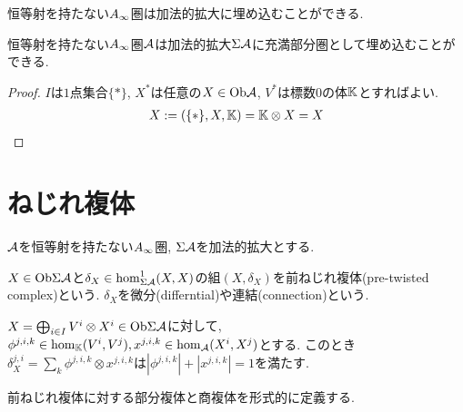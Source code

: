 \documentclass[uplatex, a4paper, 14Q, dvipdfmx]{jsarticle}
\begin{document}
恒等射を持たない$A_{\infty}$圏は加法的拡大に埋め込むことができる. 

\begin{lemma} \label{prop_A_embedding_to_TwA}
  恒等射を持たない$A_{\infty}$圏$\mathcal{A}$は加法的拡大$\Sigma\mathcal{A}$に充満部分圏として埋め込むことができる. 
\end{lemma}

\begin{proof}
  $I$は$1$点集合$\{\ast\}$, $X^\ast$は任意の$X \in \mathrm{Ob}\mathcal{A}$, $V^\ast$は標数$0$の体$\mathbb{K}$とすればよい. 
  \begin{align*}
    X := (\{\ast\}, X, \mathbb{K}) = \mathbb{K} \otimes X = X
  \end{align*}
\end{proof}

\section{ねじれ複体}

$\mathcal{A}$を恒等射を持たない$A_{\infty}$圏, $\Sigma\mathcal{A}$を加法的拡大とする. 

\begin{definition}[前ねじれ複体]
  $X \in \mathrm{Ob}\Sigma\mathcal{A}$と$\delta_X \in \hom^1_{\Sigma\mathcal{A}}(X,X)$の組$(X,\delta_X)$を前ねじれ複体(pre-twisted complex)という. 
  $\delta_X$を微分(differntial)や連結(connection)という. 
\end{definition}

\begin{remark}
  $X = \bigoplus_{i \in I} V^i \otimes X^i \in \mathrm{Ob}\Sigma\mathcal{A}$に対して, $\phi^{j,i,k} \in \hom_{\mathbb{K}}(V^i,V^j), x^{j,i,k} \in \hom_{\mathcal{A}}(X^i,X^j)$とする.
  このとき$\delta_X^{j,i} = \sum_{k} \phi^{j,i,k} \otimes x^{j,i,k}$は$|\phi^{j,i,k}| + |x^{j,i,k}| = 1$を満たす. 
\end{remark}

前ねじれ複体に対する部分複体と商複体を形式的に定義する. 

\begin{definition}[部分複体]
  
\end{definition}

\begin{definition}[商複体]
  
\end{definition}
\end{document}
